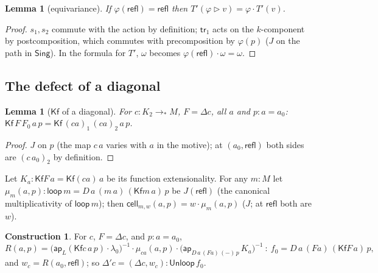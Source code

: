 \documentclass[11pt]{amsart}
\newtheorem{lemma}[theorem]{Lemma}
\theoremstyle{definition}
\newtheorem{construction}[theorem]{Construction}
\theoremstyle{remark}
\newcommand{\refl}{\mathsf{refl}}
\newcommand{\lp}{\mathsf{loop}}
\newcommand{\Kf}{\mathsf{Kf}}
\newcommand{\Unl}{\mathsf{Unloop}}
\begin{document}
\begin{lemma}[equivariance]\label{l:equiv}
If $\varphi(\refl)=\refl$ then $T'(\varphi\rhd v)=\varphi\cdot T'(v)$.
\end{lemma}
\begin{proof}
$s_1,s_2$ commute with the action by definition; $\mathsf{tr}_1$ acts on
the $k$-component by postcomposition, which commutes with precomposition
by $\varphi(p)$ ($J$ on the path in $\mathsf{Sing}$). In the formula for
$T'$, $\omega$ becomes $\varphi(\refl)\cdot\omega=\omega$.
\end{proof}

\subsection*{The defect of a diagonal}

\begin{lemma}[$\Kf$ of a diagonal]\label{l:K}
For $c:K_2\to_*M$, $F=\Delta c$, all $a$ and $p:a=a_0$:
$\Kf\,F\,F_0\,a\,p=\Kf\,(c a)_1\,(c a)_2\,a\,p$.
\end{lemma}
\begin{proof}
$J$ on $p$ (the map $c\,a$ varies with $a$ in the motive); at
$(a_0,\refl)$ both sides are $(c\,a_0)_2$ by definition.
\end{proof}
Let $K_a:\Kf F\,a=\Kf (c a)\,a$ be its function extensionality. For any
$m:M$ let $\mu_m(a,p):\lp\,m=D\,a\,(m\,a)\,(\Kf m\,a)\,p$ be $J(\refl)$
(the canonical multiplicativity of $\lp\,m$); then
$\mathsf{cell}_{m,w}(a,p)=w\cdot\mu_m(a,p)$ ($J$; at $\refl$ both are $w$).

\begin{construction}\label{c:R}
For $c$, $F=\Delta c$, and $p:a=a_0$,
\[R(a,p)=\bigl(\mathsf{ap}_L(\Kf c\,a\,p)\cdot\lambda_0\bigr)^{-1}\cdot\mu_{c a}(a,p)
\cdot\bigl(\mathsf{ap}_{D\,a\,(F a)\,(-)\,p}\,K_a\bigr)^{-1}\ :\ f_0=D\,a\,(Fa)\,(\Kf F\,a)\,p,\]
and $w_c=R(a_0,\refl)$; so $\Delta' c=(\Delta c,w_c):\Unl\,f_0$.
\end{construction}
\end{document}
